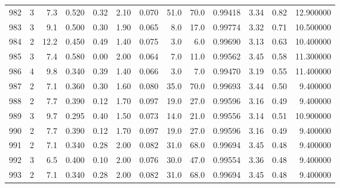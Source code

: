 \begin{tabular}{lrrrrrrrrrrrr}
982  &        3 &            7.3 &             0.520 &         0.32 &            2.10 &      0.070 &                 51.0 &                  70.0 &  0.99418 &  3.34 &       0.82 &  12.900000 \\
983  &        3 &            9.1 &             0.500 &         0.30 &            1.90 &      0.065 &                  8.0 &                  17.0 &  0.99774 &  3.32 &       0.71 &  10.500000 \\
984  &        2 &           12.2 &             0.450 &         0.49 &            1.40 &      0.075 &                  3.0 &                   6.0 &  0.99690 &  3.13 &       0.63 &  10.400000 \\
985  &        3 &            7.4 &             0.580 &         0.00 &            2.00 &      0.064 &                  7.0 &                  11.0 &  0.99562 &  3.45 &       0.58 &  11.300000 \\
986  &        4 &            9.8 &             0.340 &         0.39 &            1.40 &      0.066 &                  3.0 &                   7.0 &  0.99470 &  3.19 &       0.55 &  11.400000 \\
987  &        2 &            7.1 &             0.360 &         0.30 &            1.60 &      0.080 &                 35.0 &                  70.0 &  0.99693 &  3.44 &       0.50 &   9.400000 \\
988  &        2 &            7.7 &             0.390 &         0.12 &            1.70 &      0.097 &                 19.0 &                  27.0 &  0.99596 &  3.16 &       0.49 &   9.400000 \\
989  &        3 &            9.7 &             0.295 &         0.40 &            1.50 &      0.073 &                 14.0 &                  21.0 &  0.99556 &  3.14 &       0.51 &  10.900000 \\
990  &        2 &            7.7 &             0.390 &         0.12 &            1.70 &      0.097 &                 19.0 &                  27.0 &  0.99596 &  3.16 &       0.49 &   9.400000 \\
991  &        2 &            7.1 &             0.340 &         0.28 &            2.00 &      0.082 &                 31.0 &                  68.0 &  0.99694 &  3.45 &       0.48 &   9.400000 \\
992  &        3 &            6.5 &             0.400 &         0.10 &            2.00 &      0.076 &                 30.0 &                  47.0 &  0.99554 &  3.36 &       0.48 &   9.400000 \\
993  &        2 &            7.1 &             0.340 &         0.28 &            2.00 &      0.082 &                 31.0 &                  68.0 &  0.99694 &  3.45 &       0.48 &   9.400000 \\

\end{tabular}
